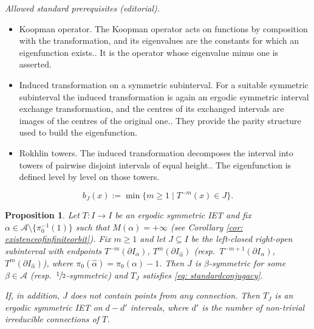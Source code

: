 \documentclass[10pt,a4paper]{article}
\providecommand{\resp}{resp.\ }
\theoremstyle{plain}
\newtheorem{proposition}[theorem]{Proposition}
\theoremstyle{definition}
\newcommand{\A}{\mathcal{A}}
\begin{document}
\noindent\textit{Allowed standard prerequisites (editorial).}\begin{itemize}
\item Koopman operator. The Koopman operator acts on functions by composition with the transformation, and its eigenvalues are the constants for which an eigenfunction exists.. It is the operator whose eigenvalue minus one is asserted.
\item Induced transformation on a symmetric subinterval. For a suitable symmetric subinterval the induced transformation is again an ergodic symmetric interval exchange transformation, and the centres of its exchanged intervals are images of the centres of the original one.. They provide the parity structure used to build the eigenfunction.
\item Rokhlin towers. The induced transformation decomposes the interval into towers of pairwise disjoint intervals of equal height.. The eigenfunction is defined level by level on those towers.
\end{itemize}\medskip
\begin{equation}
\label{eq:backward_return}
b_J(x) := \min\{m \geq 1 \mid T^{-m}(x) \in J\}.
\end{equation}

\begin{proposition}
\label{prop:induced_symmetric}
Let $T: I \to I$ be an ergodic symmetric IET and fix $\alpha \in \A \setminus \{\pi_0^{-1}(1)\}$ such that $M(\alpha) = +\infty$ (see Corollary \ref{cor: existenceofinfiniteorbit}). Fix $m \geq 1$ and let $J \subseteq I$ be the left-closed right-open subinterval with endpoints $T^{-m}(\partial I_\alpha)$, $T^{m}(\partial I_{\hat \alpha})$ (\resp $T^{-m + 1}(\partial I_\alpha)$, $T^{m}(\partial I_{\hat \alpha})$), where $\pi_0(\hat \alpha) = \pi_0(\alpha) - 1$.
Then $J$ is $\beta$-symmetric for some $\beta \in \A$ (\resp $\sfrac{1}{2}$-symmetric) and $T_J$ satisfies \eqref{eq: standardconjugacy}.

If, in addition, $J$ does not contain points from any connection. Then $T_J$ is an ergodic symmetric IET on $d - d'$ intervals, where $d'$ is the number of non-trivial {irreducible} connections of $T$.
\end{proposition}
\end{document}
